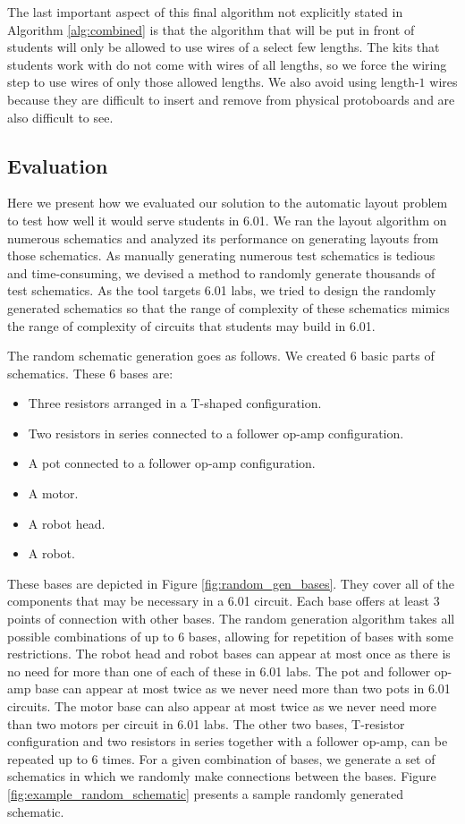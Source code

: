 The last important aspect of this final algorithm not explicitly stated in
Algorithm \ref{alg:combined} is that the algorithm that will be put
in front of students will only be allowed to use wires of a select few lengths.
The kits that students work with do not come with wires of all lengths,
so we force the wiring step to use wires of only those allowed lengths. We also
avoid using length-$1$ wires because they are difficult to insert and
remove from physical protoboards and are also difficult to see.

\subsection{Evaluation}

Here we present how we evaluated our solution to the automatic layout problem
to test how well it would serve students in 6.01.
We ran the layout algorithm on numerous schematics and
analyzed its performance on generating layouts from those schematics.
As manually generating
numerous test schematics is tedious and time-consuming, we devised a method
to randomly generate thousands of test schematics. As the tool targets 6.01 labs,
we tried to design the randomly generated schematics so that the range of
complexity of these schematics mimics the range of complexity of circuits that
students may build in 6.01.

The random schematic generation goes as follows. We created $6$ basic parts
of schematics. These $6$ bases are:
\begin{itemize}
\item Three resistors arranged in a T-shaped configuration.
\item Two resistors in series connected to a follower op-amp configuration.
\item A pot connected to a follower op-amp configuration.
\item A motor.
\item A robot head.
\item A robot.
\end{itemize}
These bases are depicted in Figure
\ref{fig:random_gen_bases}. They cover all of the components that may be
necessary in a 6.01 circuit. Each base offers at least $3$ points of
connection with other bases. The random generation algorithm takes all
possible combinations of up to
$6$ bases, allowing for repetition of bases with some restrictions.
The robot head and robot bases can appear at most once as there is
no need for more than one of each of these in 6.01 labs. The pot and follower
op-amp base can appear at most twice as we never need more than two pots in 6.01
circuits. The motor base can also appear at most twice as we never need more
than two motors per circuit in 6.01 labs. The other two bases, T-resistor
configuration and two resistors in series together with a follower op-amp, can be
repeated up to 6 times. For a given combination of bases, we generate a
set of schematics in which we randomly make connections between the
bases. Figure \ref{fig:example_random_schematic} presents a sample randomly
generated schematic.


